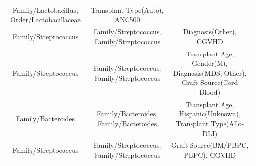 \documentclass[12pt,twoside]{dukestatscithesis}
\begin{document}
\begin{longtable}[]{@{}ccc@{}}
\begin{minipage}[t]{0.46\columnwidth}
Family/Lactobacillus, Order/Lactobacillaceae\strut
\end{minipage} & \begin{minipage}[t]{0.22\columnwidth}\centering\strut
Transplant Type(Auto), ANC500\strut
\end{minipage}\tabularnewline
\begin{minipage}[t]{0.23\columnwidth}\centering\strut
Family/Streptococcus\strut
\end{minipage} & \begin{minipage}[t]{0.46\columnwidth}\centering\strut
Family/Streptococcus, Family/Streptococcus\strut
\end{minipage} & \begin{minipage}[t]{0.22\columnwidth}\centering\strut
Diagnosis(Other), CGVHD\strut
\end{minipage}\tabularnewline
\begin{minipage}[t]{0.23\columnwidth}\centering\strut
Family/Streptococcus\strut
\end{minipage} & \begin{minipage}[t]{0.46\columnwidth}\centering\strut
Family/Streptococcus, Family/Streptococcus\strut
\end{minipage} & \begin{minipage}[t]{0.22\columnwidth}\centering\strut
Transplant Age, Gender(M), Diagnosis(MDS, Other), Graft Source(Cord
Blood)\strut
\end{minipage}\tabularnewline
\begin{minipage}[t]{0.23\columnwidth}\centering\strut
Family/Bacteroides\strut
\end{minipage} & \begin{minipage}[t]{0.46\columnwidth}\centering\strut
Family/Bacteroides, Family/Bacteroides\strut
\end{minipage} & \begin{minipage}[t]{0.22\columnwidth}\centering\strut
Transplant Age, Hispanic(Unknown), Transplant Type(Allo-DLI)\strut
\end{minipage}\tabularnewline
\begin{minipage}[t]{0.23\columnwidth}\centering\strut
Family/Streptococcus\strut
\end{minipage} & \begin{minipage}[t]{0.46\columnwidth}\centering\strut
Family/Streptococcus, Family/Streptococcus\strut
\end{minipage} & \begin{minipage}[t]{0.22\columnwidth}\centering\strut
Graft Source(BM/PBPC, PBPC), CGVHD\strut

\end{minipage}
\end{longtable}
\end{document}
